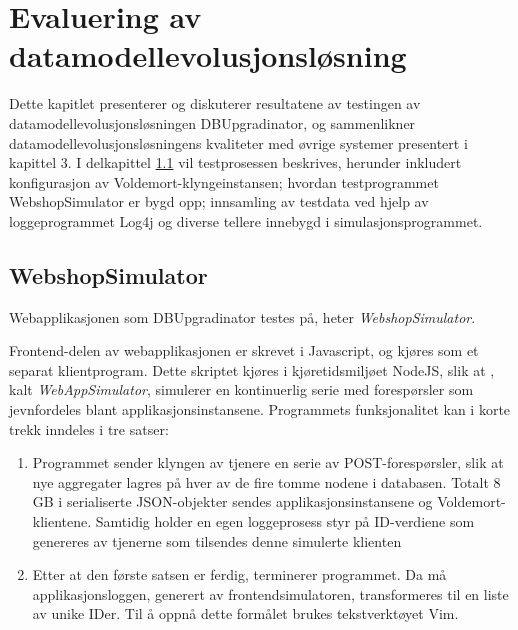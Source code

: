 
\chapter{Evaluering av datamodellevolusjonsløsning}

Dette kapitlet presenterer og diskuterer resultatene av testingen av datamodellevolusjonsløsningen DBUpgradinator, og sammenlikner datamodellevolusjonsløsningens kvaliteter med øvrige systemer presentert i kapittel 3. I delkapittel \ref{prog} vil testprosessen beskrives, herunder inkludert konfigurasjon av Voldemort-klyngeinstansen; hvordan testprogrammet WebshopSimulator er bygd opp; innsamling av testdata ved hjelp av loggeprogrammet Log4j og diverse tellere innebygd i simulasjonsprogrammet.

\section{WebshopSimulator} \label{prog}

Webapplikasjonen som DBUpgradinator testes på, heter \emph{WebshopSimulator}.

Frontend-delen av webapplikasjonen er skrevet i Javascript, og kjøres som et separat klientprogram. Dette skriptet kjøres i kjøretidsmiljøet NodeJS, slik at  , kalt \emph{WebAppSimulator}, simulerer en kontinuerlig serie med forespørsler som jevnfordeles blant applikasjonsinstansene. Programmets funksjonalitet kan i korte trekk inndeles i tre satser:

\begin{enumerate}
  \item Programmet sender klyngen av tjenere en serie av POST-forespørsler, slik at nye aggregater lagres på hver av de fire tomme nodene i databasen. Totalt 8 GB i serialiserte JSON-objekter sendes applikasjonsinstansene og Voldemort-klientene. Samtidig holder en egen loggeprosess styr på ID-verdiene som genereres av tjenerne som tilsendes denne simulerte klienten
  \item Etter at den første satsen er ferdig, terminerer programmet. Da må applikasjonsloggen, generert av frontendsimulatoren, transformeres til en liste av unike IDer. Til å oppnå dette formålet brukes tekstverktøyet Vim.
\end{enumerate}

\cleardoublepage

